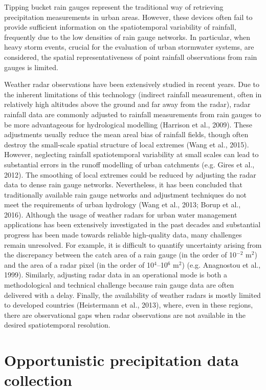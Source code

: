 \documentclass{ctuthesis}\usepackage[]{graphicx}\usepackage[]{color}
\begin{document}
Tipping bucket rain gauges represent the traditional way of retrieving precipitation measurements in urban areas. However, these devices often fail to provide sufficient information on the spatiotemporal variability of rainfall, frequently due to the low densities of rain gauge networks. In particular, when heavy storm events, crucial for the evaluation of urban stormwater systems, are considered, the spatial representativeness of point rainfall observations from rain gauges is limited. 

Weather radar observations have been extensively studied in recent years. Due to the inherent limitations of this technology (indirect rainfall measurement, often in relatively high altitudes above the ground and far away from the radar), radar rainfall data are commonly adjusted to rainfall measurements from rain gauges to be more advantageous for hydrological modelling (Harrison et al., 2009). These adjustments usually reduce the mean areal bias of rainfall fields, though often destroy the small-scale spatial structure of local extremes (Wang et al., 2015). However, neglecting rainfall spatiotemporal variability at small scales can lead to substantial errors in the runoff modelling of urban catchments (e.g. Gires et al., 2012). The smoothing of local extremes could be reduced by adjusting the radar data to dense rain gauge networks. Nevertheless, it has been concluded that traditionally available rain gauge networks and adjustment techniques do not meet the requirements of urban hydrology (Wang et al., 2013; Borup et al., 2016). Although the usage of weather radars for urban water management applications has been extensively investigated in the past decades and substantial progress has been made towards reliable high-quality data, many challenges remain unresolved. For example, it is difficult to quantify uncertainty arising from the discrepancy between the catch area of a rain gauge (in the order of 10$^{-2}$ m$^2$) and the area of a radar pixel (in the order of 10$^4$--10$^6$ m$^2$) (e.g. Anagnostou et al., 1999). Similarly, adjusting radar data in an operational mode is both a methodological and technical challenge because rain gauge data are often delivered with a delay. Finally, the availability of weather radars is mostly limited to developed countries (Heistermann et al., 2013), where, even in these regions, there are observational gaps when radar observations are not available in the desired spatiotemporal resolution.


\section{Opportunistic precipitation data collection}
\end{document}
